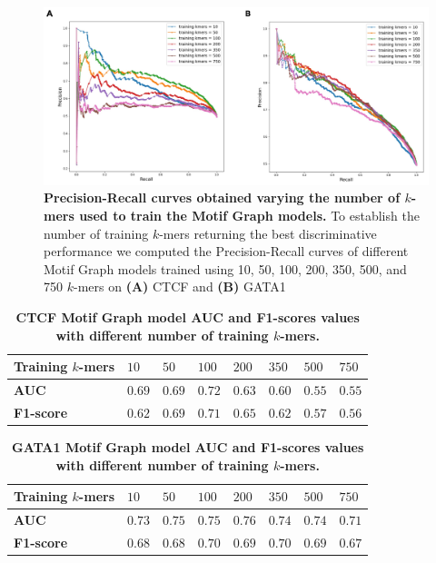 \documentclass[a4paper, titlepage, 8pt, openright]{book}
\begin{document}
\begin{figure}
	\centering
	\includegraphics[width=\textwidth]{figures/dp_mg.jpg}
	\caption[Precision-Recall curves obtained varying the number of $k$-mers used to train the Motif Graph models.]{\textbf{Precision-Recall curves obtained varying the number of $k$-mers used to train the Motif Graph models.} To establish the number of training $k$-mers returning the best discriminative performance we computed the Precision-Recall curves of different Motif Graph models trained using 10, 50, 100, 200, 350, 500, and 750 $k$-mers on \textbf{(A)} CTCF and \textbf{(B)} GATA1}
	\label{fig:dp_mg}
\end{figure} 
\begin{table}
	\centering
	\begin{tabular}{|p{3cm}|p{}|p{}|p{}|p{}|p{}|p{}|p{}|}
		\hline
		\textbf{Training $k$-mers}& \textbf{$10$}& \textbf{$50$}& \textbf{$100$}& \textbf{$200$}& \textbf{$350$}& \textbf{$500$}& \textbf{$750$} \\
		\hline
		\textbf{AUC}& $0.69$& $0.69$& $0.72$& $0.63$& $0.60$& $0.55$& $0.55$\\
		\hline
		\textbf{F1-score}& $0.62$& $0.69$& $0.71$& $0.65$& $0.62$& $0.57$& $0.56$\\
		\hline
	\end{tabular}
	\caption[CTCF Motif Graph model AUC and F1-scores values with different number of training $k$-mers.]{\textbf{CTCF Motif Graph model AUC and F1-scores values with different number of training $k$-mers.}}
	\label{table:ctcf_auc_f1}
\end{table}
\begin{table}
	\centering
	\begin{tabular}{|p{3cm}|p{}|p{}|p{}|p{}|p{}|p{}|p{}|}
		\hline
		\textbf{Training $k$-mers}& \textbf{$10$}& \textbf{$50$}& \textbf{$100$}& \textbf{$200$}& \textbf{$350$}& \textbf{$500$}& \textbf{$750$} \\
		\hline
		\textbf{AUC}& $0.73$& $0.75$& $0.75$& $0.76$& $0.74$& $0.74$& $0.71$\\
		\hline
		\textbf{F1-score}& $0.68$& $0.68$& $0.70$& $0.69$& $0.70$& $0.69$& $0.67$\\
		\hline
	\end{tabular}
	\caption[GATA1 Motif Graph model AUC and F1-scores values with different number of training $k$-mers.]{\textbf{GATA1 Motif Graph model AUC and F1-scores values with different number of training $k$-mers.}}
	\label{table:gata1_auc_f1}
\end{table}
\end{document}
